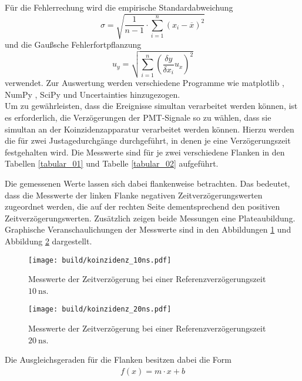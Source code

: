 \noindent Für die Fehlerrechung wird die empirische Standardabweichung
\begin{equation}
  \sigma = \sqrt{\frac{1}{n-1} \cdot \sum_{i=1}^n(x_i-\overline{x})^2}
  \label{eqn:Stdabweichung}
\end{equation}
und die Gaußsche Fehlerfortpflanzung
\begin{equation}
  u_y = \sqrt{\sum_{i=1}^n\left(\frac{\delta y}{\delta x_i}u_x\right)^2}
  \label{eqn:gauß}
\end{equation}
verwendet. Zur Auswertung werden verschiedene Programme wie matplotlib
\cite{matplotlib}, NumPy \cite{numpy}, SciPy \cite{scipy} und Uncertainties
\cite{uncertainties} hinzugezogen. \\
\newline
\noindent Um zu gewährleisten, dass die Ereignisse simultan verarbeitet werden
können, ist es erforderlich, die Verzögerungen der PMT-Signale so zu wählen, dass
sie simultan an der Koinzidenzapparatur verarbeitet werden können. Hierzu werden
die für zwei Justagedurchgänge durchgeführt, in denen je eine Verzögerungszeit
festgehalten wird. Die Messwerte sind für je zwei verschiedene Flanken in den
Tabellen \ref{tabular_01} und Tabelle \ref{tabular_02} aufgeführt. \\
\FloatBarrier

\FloatBarrier
\FloatBarrier

\FloatBarrier
\noindent Die gemessenen Werte lassen sich dabei flankenweise betrachten. Das
bedeutet, dass die Messwerte der linken Flanke negativen Zeitverzögerungswerten
zugeordnet werden, die auf der rechten Seite dementsprechend den positiven
Zeitverzögerungswerten. Zusätzlich zeigen beide Messungen eine Plateaubildung.
Graphische Veranschaulichungen der Messwerte sind in den Abbildungen \ref{fig:04}
und Abbildung \ref{fig:05} dargestellt.
\FloatBarrier
\begin{figure}
  \centering
  \texttt{[image: build/koinzidenz\_10ns.pdf]}
  \caption{Messwerte der Zeitverzögerung bei einer Referenzverzögerungszeit $\SI{10}{\nano\second}$.}
  \label{fig:04}
\end{figure}
\FloatBarrier
\FloatBarrier
\begin{figure}
  \centering
  \texttt{[image: build/koinzidenz\_20ns.pdf]}
  \caption{Messwerte der Zeitverzögerung bei einer Referenzverzögerungszeit $\SI{20}{\nano\second}$.}
  \label{fig:05}
\end{figure}
\FloatBarrier
\noindent Die Ausgleichsgeraden für die Flanken
besitzen dabei die Form
\begin{align}
  f(x) = m \cdot x + b
  \label{eqn:08}
\end{align}
